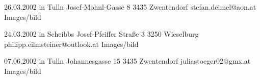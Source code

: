 
\begin{Diplomandenvorstellung}

		  {26.03.2002 in Tulln}
		  {Josef-Mohnl-Gasse 8}
		  {3435 Zwentendorf}
		  {
		  }
		  {stefan.deimel@aon.at}
		  {Images/bild}
\newpage	  

		  {24.03.2002 in Scheibbs}
		  {Josef-Pfeiffer Straße 3}
		  {3250 Wieselburg}
		  {
		  }
		  {philipp.eilmsteiner@outlook.at}
		  {Images/bild}
\newpage

		  {07.06.2002 in Tulln}
		  {Johannesgasse 15}
		  {3435 Zwentendorf}
		  {
		  }
		  {juliastoeger02@gmx.at}
		  {Images/bild}
		  
\end{Diplomandenvorstellung}

